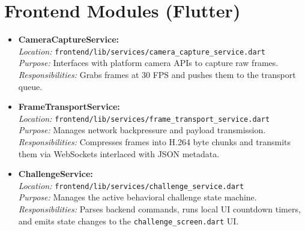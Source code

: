 \section{Frontend Modules (Flutter)}
\begin{itemize}
    \item \textbf{CameraCaptureService:} \\
    \textit{Location:} \texttt{frontend/lib/services/camera\_capture\_service.dart} \\
    \textit{Purpose:} Interfaces with platform camera APIs to capture raw frames. \\
    \textit{Responsibilities:} Grabs frames at 30 FPS and pushes them to the transport queue.
    
    \item \textbf{FrameTransportService:} \\
    \textit{Location:} \texttt{frontend/lib/services/frame\_transport\_service.dart} \\
    \textit{Purpose:} Manages network backpressure and payload transmission. \\
    \textit{Responsibilities:} Compresses frames into H.264 byte chunks and transmits them via WebSockets interlaced with JSON metadata.
    
    \item \textbf{ChallengeService:} \\
    \textit{Location:} \texttt{frontend/lib/services/challenge\_service.dart} \\
    \textit{Purpose:} Manages the active behavioral challenge state machine. \\
    \textit{Responsibilities:} Parses backend commands, runs local UI countdown timers, and emits state changes to the \texttt{challenge\_screen.dart} UI.
\end{itemize}

